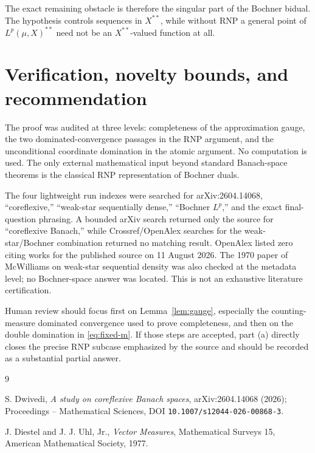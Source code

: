 \documentclass[11pt]{article}
\begin{document}
The exact remaining obstacle is therefore the singular part of the Bochner
bidual.  The hypothesis controls sequences in $X^{**}$, while without RNP a
general point of $L^p(\mu,X)^{**}$ need not be an $X^{**}$-valued function at
all.

\section{Verification, novelty bounds, and recommendation}

The proof was audited at three levels: completeness of the approximation
gauge, the two dominated-convergence passages in the RNP argument, and the
unconditional coordinate domination in the atomic argument.  No computation
is used.  The only external mathematical input beyond standard Banach-space
theorems is the classical RNP representation of Bochner duals.

The four lightweight run indexes were searched for arXiv:2604.14068,
``coreflexive,'' ``weak-star sequentially dense,'' ``Bochner $L^p$,'' and the
exact final-question phrasing.  A bounded arXiv search returned only the
source for ``coreflexive Banach,'' while Crossref/OpenAlex searches for the
weak-star/Bochner combination returned no matching result.  OpenAlex listed
zero citing works for the published source on 11 August 2026.  The 1970 paper
of McWilliams on weak-star sequential density was also checked at the metadata
level; no Bochner-space answer was located.  This is not an exhaustive
literature certification.

Human review should focus first on Lemma~\ref{lem:gauge}, especially the
counting-measure dominated convergence used to prove completeness, and then on
the double domination in \eqref{eq:fixed-m}.  If those steps are accepted,
part (a) directly closes the precise RNP subcase emphasized by the source and
should be recorded as a substantial partial answer.

\begin{thebibliography}{9}

S. Dwivedi,
\emph{A study on coreflexive Banach spaces},
arXiv:2604.14068 (2026); Proceedings -- Mathematical Sciences,
DOI \texttt{10.1007/s12044-026-00868-3}.

J. Diestel and J. J. Uhl, Jr.,
\emph{Vector Measures},
Mathematical Surveys 15, American Mathematical Society, 1977.

\end{thebibliography}
\end{document}
